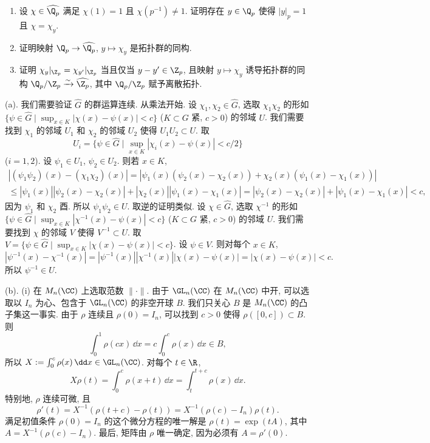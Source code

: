 \begin{exercise}
\begin{enumerate}
\begin{enumerate}
  \[
  \chi(p^{-k}) = \exp\Bigl(2\pi i\sum_{r=1}^k c_{k-r}p^{-r}\Bigr).
  \]
  \item[(v)] 设 $\chi \in \widehat{\Q_p}$ 满足 $\chi(1) = 1$ 且 $\chi(p^{-1}) \neq 1$. 证明存在 $y \in \Q_p$ 使得 $|y|_p = 1$ 且 $\chi = \chi_y$.
  \item[(vi)] 证明映射 $\Q_p \to \widehat{\Q_p}$, $y \longmapsto \chi_y$ 是拓扑群的同构.
  \item[(vii)] 证明 $\chi_y|_{\Z_p} = \chi_{y'}|_{\Z_p}$ 当且仅当 $y - y' \in \Z_p$, 且映射 $y \longmapsto \chi_y$ 诱导拓扑群的同构 $\Q_p/\Z_p \xrightarrow{\sim} \widehat{\Z_p}$, 其中 $\Q_p/\Z_p$ 赋予离散拓扑.
  \end{enumerate}
\end{enumerate}
\end{exercise}

\begin{solution}
(a). 我们需要验证 $\widehat{G}$ 的群运算连续. 从乘法开始. 设 $\chi_1, \chi_2 \in \widehat{G}$, 选取 $\chi_1\chi_2$ 的形如 $\{\psi \in \widehat{G} \mid \sup_{x \in K}|\chi(x) - \psi(x)| < c\}$ ($K \subset G$ 紧, $c > 0$) 的邻域 $U$. 我们需要找到 $\chi_1$ 的邻域 $U_1$ 和 $\chi_2$ 的邻域 $U_2$ 使得 $U_1U_2 \subset U$. 取
\[
U_i = \{\psi \in \widehat{G} \mid \sup_{x \in K}|\chi_i(x) - \psi(x)| < c/2\}
\]
($i = 1, 2$). 设 $\psi_1 \in U_1$, $\psi_2 \in U_2$. 则若 $x \in K$,
\begin{multline*}
|(\psi_1\psi_2)(x) - (\chi_1\chi_2)(x)| = |\psi_1(x)(\psi_2(x) - \chi_2(x)) + \chi_2(x)(\psi_1(x) - \chi_1(x))| \\
\leq |\psi_1(x)||\psi_2(x) - \chi_2(x)| + |\chi_2(x)||\psi_1(x) - \chi_1(x)| = |\psi_2(x) - \chi_2(x)| + |\psi_1(x) - \chi_1(x)| < c,
\end{multline*}
因为 $\psi_1$ 和 $\chi_2$ 酉. 所以 $\psi_1\psi_2 \in U$.
取逆的证明类似. 设 $\chi \in \widehat{G}$, 选取 $\chi^{-1}$ 的形如 $\{\psi \in \widehat{G} \mid \sup_{x \in K}|\chi^{-1}(x) - \psi(x)| < c\}$ ($K \subset G$ 紧, $c > 0$) 的邻域 $U$. 我们需要找到 $\chi$ 的邻域 $V$ 使得 $V^{-1} \subset U$. 取 $V = \{\psi \in \widehat{G} \mid \sup_{x \in K}|\chi(x) - \psi(x)| < c\}$. 设 $\psi \in V$. 则对每个 $x \in K$,
\[
|\psi^{-1}(x) - \chi^{-1}(x)| = |\psi^{-1}(x)||\chi^{-1}(x)||\chi(x) - \psi(x)| = |\chi(x) - \psi(x)| < c.
\]
所以 $\psi^{-1} \in U$.

(b). (i) 在 $M_n(\CC)$ 上选取范数 $\|\cdot\|$. 由于 $\GL_n(\CC)$ 在 $M_n(\CC)$ 中开, 可以选取以 $I_n$ 为心、包含于 $\GL_n(\CC)$ 的非空开球 $B$. 我们只关心 $B$ 是 $M_n(\CC)$ 的凸子集这一事实. 由于 $\rho$ 连续且 $\rho(0) = I_n$, 可以找到 $c > 0$ 使得 $\rho([0, c]) \subset B$. 则
\[
\int_0^1\rho(cx)\,\dd x = c\int_0^c\rho(x)\,\dd x \in B,
\]
所以 $X := \int_0^c\rho(x)\,\dd x \in \GL_n(\CC)$. 对每个 $t \in \R$,
\[
X\rho(t) = \int_0^c\rho(x + t)\,\dd x = \int_t^{t+c}\rho(x)\,\dd x.
\]
特别地, $\rho$ 连续可微, 且
\[
\rho'(t) = X^{-1}(\rho(t + c) - \rho(t)) = X^{-1}(\rho(c) - I_n)\rho(t).
\]
满足初值条件 $\rho(0) = I_n$ 的这个微分方程的唯一解是 $\rho(t) = \exp(tA)$, 其中 $A = X^{-1}(\rho(c) - I_n)$. 最后, 矩阵由 $\rho$ 唯一确定, 因为必须有 $A = \rho'(0)$.


\end{solution}
